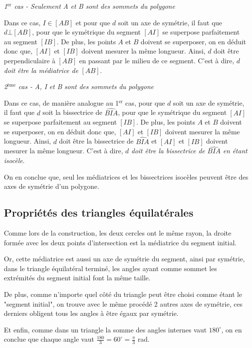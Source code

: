 \documentclass[a4paper, twoside]{article}
\begin{document}
\smallbreak

\textit{1$^{\text{er}}$ cas - Seulement A et B sont des sommets du polygone}

Dans ce cas, $I \in [AB]$ et pour que $d$ soit un axe de symétrie,
il faut que $d\bot[AB]$, pour que le symétrique du segment $[AI]$ se
superpose parfaitement au segment $[IB]$.
De plus, les points $A$ et $B$ doivent se superposer,
on en déduit donc que,
$[AI]$ et $[IB]$ doivent mesurer la même longueur.
Ainsi, $d$ doit être perpendiculaire à $[AB]$ en passant par le milieu de ce segment.
C'est à dire, \emph{$d$ doit être la médiatrice de $[AB]$}.

\smallbreak

\textit{2$^{\text{ème}}$ cas - A, I et B sont des sommets du polygone}

Dans ce cas, de manière analogue au 1$^{\text{er}}$ cas,
pour que $d$ soit un axe de symétrie,
il faut que $d$ soit la bissectrice de $\widehat{BIA}$,
pour que le symétrique du segment $[AI]$ se
superpose parfaitement au segment $[IB]$.
De plus, les points $A$ et $B$ doivent se superposer,
on en déduit donc que,
$[AI]$ et $[IB]$ doivent mesurer la même longueur.
Ainsi, $d$ doit être la bissectrice de $\widehat{BIA}$ et $[AI]$ et $[IB]$ doivent mesurer la même longueur.
C'est à dire, \emph{$d$ doit être la bissectrice de $\widehat{BIA}$ en étant isocèle}.

On en conclue que, seul les médiatrices et les bissectrices isocèles peuvent être des
axes de symétrie d'un polygone.

\subsection*{Propriétés des triangles équilatérales} \label{propriete_triangle_equilateral}

Comme lors de la construction,
les deux cercles ont le même rayon,
la droite formée avec les deux points d'intersection est la médiatrice du segment initial.

Or, cette médiatrice est aussi un axe de symétrie du segment,
ainsi par symétrie, dans le triangle équilatéral terminé,
les angles ayant comme sommet les extrémités du segment initial font la même taille.

De plus, comme n'importe quel côté du triangle peut être choisi comme étant le "segment initial",
on trouve avec le même procédé 2 autres axes de symétrie,
ces derniers obligent tous les angles à être égaux par symétrie.

Et enfin, comme dans un triangle la somme des angles internes vaut $180^\circ$,
on en conclue que chaque angle vaut $\frac{180}{3} = 60^\circ = \frac{\pi}{3}$ rad.
\end{document}

